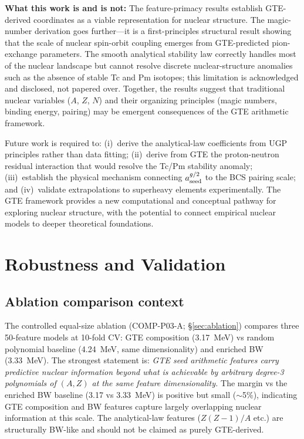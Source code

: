 \documentclass[9pt,twocolumn]{extarticle}
\begin{document}
\textbf{What this work is and is not:} The feature-primacy results establish GTE-derived coordinates as a viable representation for nuclear structure. The magic-number derivation goes further---it is a first-principles structural result showing that the scale of nuclear spin-orbit coupling emerges from GTE-predicted pion-exchange parameters. The smooth analytical stability law correctly handles most of the nuclear landscape but cannot resolve discrete nuclear-structure anomalies such as the absence of stable Tc and Pm isotopes; this limitation is acknowledged and disclosed, not papered over. Together, the results suggest that traditional nuclear variables ($A$, $Z$, $N$) and their organizing principles (magic numbers, binding energy, pairing) may be emergent consequences of the GTE arithmetic framework.

Future work is required to: (i)~derive the analytical-law coefficients from UGP principles rather than data fitting; (ii)~derive from GTE the proton-neutron residual interaction that would resolve the Tc/Pm stability anomaly; (iii)~establish the physical mechanism connecting $a_{\rm seed}^{g/2}$ to the BCS pairing scale; and (iv)~validate extrapolations to superheavy elements experimentally. The GTE framework provides a new computational and conceptual pathway for exploring nuclear structure, with the potential to connect empirical nuclear models to deeper theoretical foundations.

\section{Robustness and Validation}
\label{sec:robustness}

\subsection{Ablation comparison context}

The controlled equal-size ablation (COMP-P03-A; \S\ref{sec:ablation}) compares three 50-feature models at 10-fold CV: GTE composition (3.17~MeV) vs random polynomial baseline (4.24~MeV, same dimensionality) and enriched BW (3.33~MeV). The strongest statement is: \emph{GTE seed arithmetic features carry predictive nuclear information beyond what is achievable by arbitrary degree-3 polynomials of $(A,Z)$ at the same feature dimensionality.} The margin vs the enriched BW baseline (3.17 vs 3.33~MeV) is positive but small ($\sim$5\%), indicating GTE composition and BW features capture largely overlapping nuclear information at this scale. The analytical-law features ($Z(Z-1)/A$ etc.) are structurally BW-like and should not be claimed as purely GTE-derived.
\end{document}
